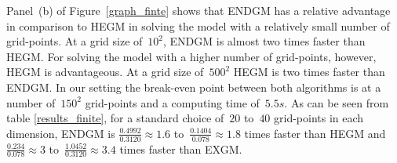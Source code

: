 \documentclass[a4paper,12pt]{article}%
\begin{document}
Panel~(b) of Figure~\ref{graph_finte} shows that ENDGM has a relative
advantage in comparison to HEGM in solving the model with a relatively small
number of grid-points. At a grid size of~$10^{2}$, ENDGM is almost two times
faster than HEGM. For solving the model with a higher number of grid-points,
however, HEGM is advantageous. At a grid size of~$500^{2}$ HEGM is two times
faster than ENDGM. In our setting the break-even point between both algorithms
is at a number of~$150^{2}$ grid-points and a computing time of~$5.5s.$ As can
be seen from table \ref{results_finite}, for a standard choice of~$20$ to~$40$
grid-points in each dimension, ENDGM is $\frac{0.4992}{0.3120}\approx1.6$
to~$\frac{0.1404}{0.078}\approx1.8$ times faster than HEGM and $\frac
{0.234}{0.078}\approx3$ to~$\frac{1.0452}{0.3120}\approx3.4$ times faster than EXGM.%
\end{document}
